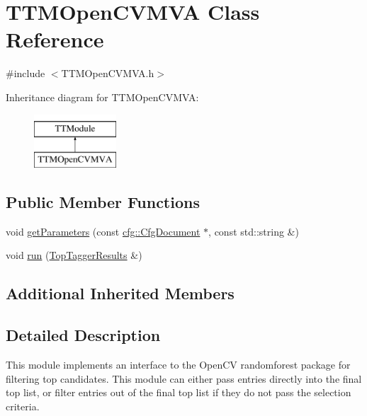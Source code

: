 \hypertarget{classTTMOpenCVMVA}{\section{T\-T\-M\-Open\-C\-V\-M\-V\-A Class Reference}
\label{classTTMOpenCVMVA}
}


{\ttfamily \#include $<$T\-T\-M\-Open\-C\-V\-M\-V\-A.\-h$>$}

Inheritance diagram for T\-T\-M\-Open\-C\-V\-M\-V\-A\-:\begin{figure}[H]
\begin{center}
\leavevmode
\includegraphics[height=2.000000cm]{classTTMOpenCVMVA}
\end{center}
\end{figure}
\subsection*{Public Member Functions}
\begin{DoxyCompactItemize}
\item 
void \hyperlink{classTTMOpenCVMVA_a9842e490d60a486958ba93b6f0f5d00e}{get\-Parameters} (const \hyperlink{classcfg_1_1CfgDocument}{cfg\-::\-Cfg\-Document} $\ast$, const std\-::string \&)
\item 
void \hyperlink{classTTMOpenCVMVA_af51d1bf351304ef8c6e732763d58c433}{run} (\hyperlink{classTopTaggerResults}{Top\-Tagger\-Results} \&)
\end{DoxyCompactItemize}
\subsection*{Additional Inherited Members}


\subsection{Detailed Description}
This module implements an interface to the Open\-C\-V randomforest package for filtering top candidates. This module can either pass entries directly into the final top list, or filter entries out of the final top list if they do not pass the selection criteria.


